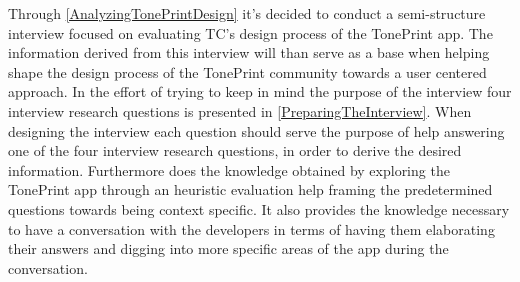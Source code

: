 %
Through \autoref{AnalyzingTonePrintDesign} it's decided to conduct a semi-structure interview focused on evaluating TC's design process of the TonePrint app. The information derived from this interview will than serve as a base when helping shape the design process of the TonePrint community towards a user centered approach. In the effort of trying to keep in mind the purpose of the interview four interview research questions is presented in \autoref{PreparingTheInterview}. When designing the interview each question should serve the purpose of help answering one of the four interview research questions, in order to derive the desired information. Furthermore does the knowledge obtained by exploring the TonePrint app through an heuristic evaluation help framing the predetermined questions towards being context specific. It also provides the knowledge necessary to have a conversation with the developers in terms of having them elaborating their answers and digging into more specific areas of the app during the conversation. 
%

